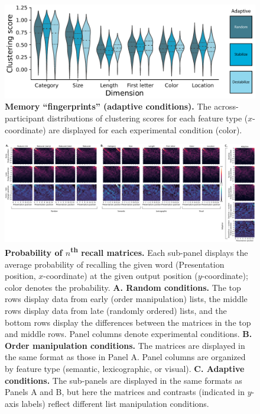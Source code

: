 \documentclass{article}
\begin{document}
\begin{figure}[tp] \centering
    \includegraphics[width=\textwidth]{figures/fingerprints_adaptive}
    
    \caption{\textbf{Memory ``fingerprints'' (adaptive conditions).}
    The across-participant distributions of clustering scores for each feature
    type ($x$-coordinate) are displayed for each experimental condition
    (color).}
        \label{fig:fingerprints-adaptive}
\end{figure}


\begin{figure}
    \includegraphics[width=\textwidth]{figures/pnr_matrices}

    \caption{\textbf{Probability of $n$\textsuperscript{th} recall matrices.}  Each sub-panel displays
    the average probability of recalling the given word (Presentation position, $x$-coordinate)
    at the given output position ($y$-coordinate); color denotes the probability.  \textbf{A. Random conditions.}  The top rows
    display data from early (order manipulation) lists, the middle rows display data from late (randomly ordered)
    lists, and the bottom rows display the differences between the matrices in the top and middle rows.  Panel columns denote experimental conditions.
    \textbf{B. Order manipulation conditions.}  The matrices are displayed in the same format as those in Panel A.
    Panel columns are organized by feature type (semantic, lexicographic, or visual).  \textbf{C. Adaptive conditions.}
    The sub-panels are displayed in the same formats as Panels A and B, but here the matrices
    and contrasts (indicated in $y$-axis labels) reflect different list manipulation conditions.}

    \label{fig:pnr}
\end{figure}
\end{document}
